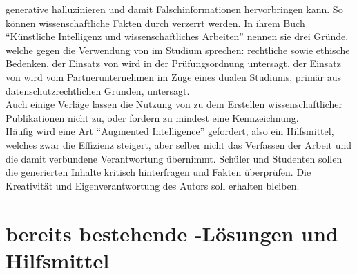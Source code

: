 \documentclass[../main.tex]{subfiles}
\begin{document}
generative  halluzinieren und damit Falschinformationen hervorbringen kann. So können wissenschaftliche Fakten durch  verzerrt werden. In ihrem Buch "`Künstliche Intelligenz und wissenschaftliches Arbeiten"' nennen sie drei 
Gründe, welche gegen die Verwendung von  im Studium sprechen: rechtliche sowie ethische Bedenken, der Einsatz von  wird in der Prüfungsordnung untersagt, 
der Einsatz von  wird vom Partnerunternehmen im Zuge eines dualen Studiums, primär aus datenschutzrechtlichen Gründen, untersagt.\cite{BucherSchwarzerHolzwweißig} \\Auch einige Verläge lassen 
die Nutzung von  zu dem Erstellen wissenschaftlicher Publikationen nicht zu, oder fordern zu mindest eine Kennzeichnung\cite{ZukunftWissenschaftlichesPublizieren}.\\ 
Häufig wird eine Art "`Augmented Intelligence"' gefordert, also ein Hilfsmittel, welches zwar die Effizienz steigert, aber selber nicht das Verfassen der 
Arbeit und die damit verbundene Verantwortung übernimmt. Schüler und Studenten sollen die generierten Inhalte kritisch hinterfragen und Fakten überprüfen. Die Kreativität und 
Eigenverantwortung des Autors soll erhalten bleiben.\cite{BucherSchwarzerHolzwweißig,humanWritingToAi,teachers,ZukunftWissenschaftlichesPublizieren} 

\section{bereits bestehende -Lösungen und Hilfsmittel}
\label{sec:bereitsBestehendeLoesungen}
\end{document}
